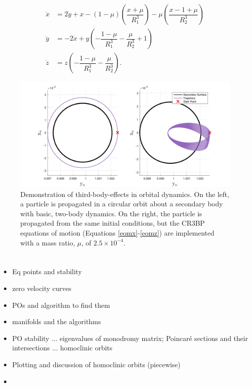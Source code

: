\documentclass[11pt]{article} %
\begin{document}
\begin{align}
\ddot{x} &=  2\dot{y} + x - (1-\mu)\left(\dfrac{x+\mu}{R_1^3}\right) - \mu\left(\dfrac{x-1+\mu}{R_2^3}\right) \label{eomx}\\
\ddot{y} &= - 2\dot{x} + y\left(-\dfrac{1-\mu}{R_1^3} - \dfrac{\mu}{R_2^3} + 1\right) \label{eomy}\\
\ddot{z} &= z\left(-\dfrac{1 - \mu}{R_1^3} - \dfrac{\mu}{R_2^3}\right). \label{eomz}
\end{align} 

\begin{figure}[H]
\centering
\includegraphics[width=6in]{cr3bpEffectExample.png}
\caption{Demonstration of third-body-effects in orbital dynamics. On the left, a particle is propagated in a circular orbit about a secondary body with basic, two-body dynamics. On the right, the particle is propagated from the same initial conditions, but the CR3BP equations of motion (Equations \ref{eomx}-\ref{eomz}) are implemented with a mass ratio, $\mu$, of $2.5\times10^{-4}$.}
\label{fig:cr3bpEffectExample}
\end{figure}


\section*{\color{red}{Periodic/Homoclinic Orbits}}
\begin{itemize}
	\item \color{red}Eq points and stability
	\item zero velocity curves
	\item POs and algorithm to find them
	\item manifolds and the algorithms
	\item PO stability ... eigenvalues of monodromy matrix; Poincaré sections and their intersections ... homoclinic orbits
	\item Plotting and discussion of homoclinic orbits (piecewise)
	\item \color{black}
\end{itemize}
\end{document}
